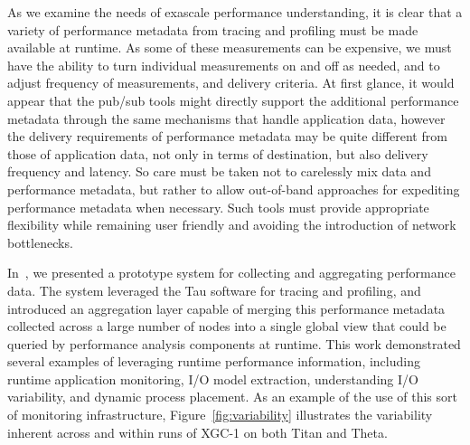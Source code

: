 As we examine the needs of exascale performance understanding, it is clear that a variety of performance metadata from tracing and profiling must be made available at runtime. As some of these measurements can be expensive, we must have the ability to turn individual measurements on and off as needed, and to adjust frequency of measurements, and delivery criteria. At first glance, it would appear that the pub/sub tools might directly support the additional performance metadata through the same mechanisms that handle application data, however the delivery requirements of performance metadata may be quite different from those of application data, not only in terms of destination, but also delivery frequency and latency. So care must be taken not to carelessly mix data and performance metadata, but rather to allow out-of-band approaches for expediting performance metadata when necessary. Such tools must provide appropriate flexibility while remaining user friendly and avoiding the introduction of network bottlenecks.

In~\cite{mona2019}, we presented a prototype system for collecting and aggregating performance data. The system leveraged the Tau software for tracing and profiling, and introduced an aggregation layer capable of merging this performance metadata collected across a large number of nodes into a single global view that could be queried by performance analysis components at runtime. 
This work demonstrated several examples of leveraging runtime performance information, including runtime application monitoring, I/O model extraction, understanding I/O variability, and dynamic process placement.
As an example of the use of this sort of monitoring infrastructure, Figure~\ref{fig:variability} illustrates the variability inherent across and within runs of XGC-1 on both Titan and Theta. 



